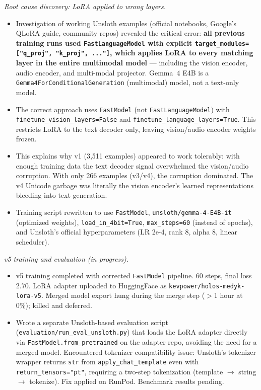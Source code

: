 \documentclass{article}
\theoremstyle{plain}
\theoremstyle{definition}
\theoremstyle{remark}
\begin{document}
\textit{Root cause discovery: LoRA applied to wrong layers.}
\begin{itemize}
\item Investigation of working Unsloth examples (official notebooks, Google's QLoRA guide, community repos) revealed the critical error: \textbf{all previous training runs used \texttt{FastLanguageModel} with explicit \texttt{target\_modules=["q\_proj", "k\_proj", ..."]}, which applies LoRA to every matching layer in the entire multimodal model} --- including the vision encoder, audio encoder, and multi-modal projector. Gemma~4 E4B is a \texttt{Gemma4ForConditionalGeneration} (multimodal) model, not a text-only model.
\item The correct approach uses \texttt{FastModel} (not \texttt{FastLanguageModel}) with \texttt{finetune\_vision\_layers=False} and \texttt{finetune\_language\_layers=True}. This restricts LoRA to the text decoder only, leaving vision/audio encoder weights frozen.
\item This explains why v1 (3{,}511 examples) appeared to work tolerably: with enough training data the text decoder signal overwhelmed the vision/audio corruption. With only 266 examples (v3/v4), the corruption dominated. The v4 Unicode garbage was literally the vision encoder's learned representations bleeding into text generation.
\item Training script rewritten to use \texttt{FastModel}, \texttt{unsloth/gemma-4-E4B-it} (optimized weights), \texttt{load\_in\_4bit=True}, \texttt{max\_steps=60} (instead of epochs), and Unsloth's official hyperparameters (LR 2e-4, rank 8, alpha 8, linear scheduler).
\end{itemize}

\textit{v5 training and evaluation (in progress).}
\begin{itemize}
\item v5 training completed with corrected \texttt{FastModel} pipeline. 60 steps, final loss 2.70. LoRA adapter uploaded to HuggingFace as \texttt{kevpower/holos-medyk-lora-v5}. Merged model export hung during the merge step ($>$1 hour at 0\%); killed and deferred.
\item Wrote a separate Unsloth-based evaluation script (\texttt{evaluation/run\_eval\_unsloth.py}) that loads the LoRA adapter directly via \texttt{FastModel.from\_pretrained} on the adapter repo, avoiding the need for a merged model. Encountered tokenizer compatibility issue: Unsloth's tokenizer wrapper returns \texttt{str} from \texttt{apply\_chat\_template} even with \texttt{return\_tensors="pt"}, requiring a two-step tokenization (template $\rightarrow$ string $\rightarrow$ tokenize). Fix applied on RunPod. Benchmark results pending.
\end{itemize}
\end{document}
